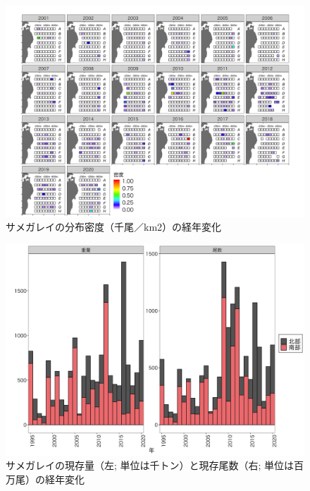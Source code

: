 \documentclass[11pt]{article} %
\begin{document}
\begin{linenumbers}
\begin{figure}[h]
  \centering
  \includegraphics[width = 14cm]{サメガレイdens.png}
  \caption{サメガレイの分布密度（千尾／km2）の経年変化}
\end{figure}

\begin{figure}[h]
  \centering
  \includegraphics[width = 14cm]{サメガレイtrend.png}
  \caption{サメガレイの現存量（左; 単位は千トン）と現存尾数（右; 単位は百万尾）の経年変化}
\end{figure}


\end{linenumbers}
\end{document}
